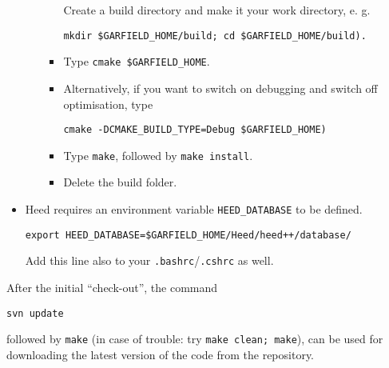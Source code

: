 \begin{itemize}
\begin{enumerate}
\begin{itemize}
  Create a build directory and make it your work directory, e. g.
  \begin{lstlisting}
mkdir $GARFIELD_HOME/build; cd $GARFIELD_HOME/build).
  \end{lstlisting}
  \item
  Type \texttt{cmake \$GARFIELD\_HOME}.
  \item
  Alternatively, if you want to switch on debugging and switch off optimisation, type 
  \begin{lstlisting}
cmake -DCMAKE_BUILD_TYPE=Debug $GARFIELD_HOME)
  \end{lstlisting}
  \item
  Type \texttt{make}, followed by \texttt{make install}.
  \item
  Delete the build folder.
  \end{itemize}
  \end{enumerate}
  \item
  Heed requires an environment variable \texttt{HEED\_DATABASE}
  to be defined.
  \begin{lstlisting}
export HEED_DATABASE=$GARFIELD_HOME/Heed/heed++/database/
  \end{lstlisting}
  Add this line also to your \texttt{.bashrc}/\texttt{.cshrc} as well.
\end{itemize}

After the initial ``check-out'', the command 
\begin{lstlisting}
svn update
\end{lstlisting}
followed by \texttt{make} 
(in case of trouble: try \texttt{make clean; make}),
can be used for downloading the latest version of the code 
from the repository.

%
%

